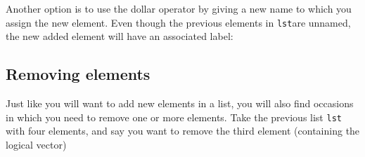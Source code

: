 \documentclass[
]{book}
\newenvironment{Shaded}{\begin{snugshade}}{\end{snugshade}}
\newcommand{\ConstantTok}[1]{\textcolor[rgb]{0.00,0.00,0.00}{#1}}
\newcommand{\DecValTok}[1]{\textcolor[rgb]{0.00,0.00,0.81}{#1}}
\newcommand{\ErrorTok}[1]{\textcolor[rgb]{0.64,0.00,0.00}{\textbf{#1}}}
\newcommand{\NormalTok}[1]{#1}
\newcommand{\OtherTok}[1]{\textcolor[rgb]{0.56,0.35,0.01}{#1}}
\newcommand{\SpecialCharTok}[1]{\textcolor[rgb]{0.00,0.00,0.00}{#1}}
\newcommand{\StringTok}[1]{\textcolor[rgb]{0.31,0.60,0.02}{#1}}
\begin{document}
Another option is to use the dollar operator by giving a new name to which you
assign the new element. Even though the previous elements in \texttt{lst}are unnamed,
the new added element will have an associated label:

\begin{Shaded}
\end{Shaded}

\hypertarget{removing-elements}{%
\subsection{Removing elements}\label{removing-elements}}

Just like you will want to add new elements in a list, you will also find
occasions in which you need to remove one or more elements. Take the previous
list \texttt{lst} with four elements, and say you want to remove the third element
(containing the logical vector)

\begin{Shaded}
\end{Shaded}
\end{document}
